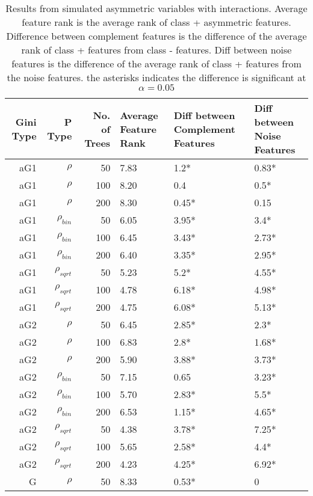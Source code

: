 \documentclass[twoside,11pt]{article}
\begin{document}
\begin{table}%
  \centering
  \caption{Results from simulated asymmetric variables with interactions. Average feature rank is the average rank of class + asymmetric features. Difference between complement features is the difference of the average rank of class + features from class - features. Diff between noise features is the difference of the average rank of class + features from the noise features. the asterisks indicates the difference is significant at $\alpha=0.05$ }
\begin{tabular}{rrrp{2.5cm}p{2.5cm}p{2.5cm}}
\hline
Gini Type & P Type & No. of Trees & Average Feature Rank & Diff between Complement Features & Diff between Noise Features \bigstrut\\
\hline
\renewcommand{\arraystretch}{.5}
aG1   & $\rho$ & 50    & 7.83  & 1.2*  & 0.83* \bigstrut[t]\\
aG1   & $\rho$ & 100   & 8.20  & 0.4   & 0.5* \\
aG1   & $\rho$ & 200   & 8.30  & 0.45* & 0.15 \\
aG1   & $\rho_{bin}$ & 50    & 6.05  & 3.95* & 3.4* \\
aG1   & $\rho_{bin}$ & 100   & 6.45  & 3.43* & 2.73* \\
aG1   & $\rho_{bin}$ & 200   & 6.40  & 3.35* & 2.95* \\
aG1   & $\rho_{sqrt}$ & 50    & 5.23  & 5.2*  & 4.55* \\
aG1   & $\rho_{sqrt}$ & 100   & 4.78  & 6.18* & 4.98* \\
aG1   & $\rho_{sqrt}$ & 200   & 4.75  & 6.08* & 5.13* \\
aG2   & $\rho$ & 50    & 6.45  & 2.85* & 2.3* \\
aG2   & $\rho$ & 100   & 6.83  & 2.8*  & 1.68* \\
aG2   & $\rho$ & 200   & 5.90  & 3.88* & 3.73* \\
aG2   & $\rho_{bin}$ & 50    & 7.15  & 0.65  & 3.23* \\
aG2   & $\rho_{bin}$ & 100   & 5.70  & 2.83* & 5.5* \\
aG2   & $\rho_{bin}$ & 200   & 6.53  & 1.15* & 4.65* \\
aG2   & $\rho_{sqrt}$ & 50    & 4.38  & 3.78* & 7.25* \\
aG2   & $\rho_{sqrt}$ & 100   & 5.65  & 2.58* & 4.4* \\
aG2   & $\rho_{sqrt}$ & 200   & 4.23  & 4.25* & 6.92* \\
G     & $\rho$ & 50    & 8.33  & 0.53* & 0 \\

\end{tabular}
\end{table}
\end{document}
